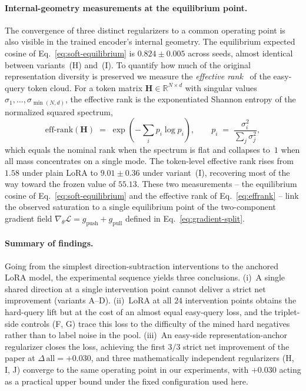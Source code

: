 \paragraph{Internal-geometry measurements at the equilibrium point.}
The convergence of three distinct regularizers to a common operating point is also visible in the trained encoder's internal geometry. The equilibrium expected cosine of Eq.~\eqref{eq:soft-equilibrium} is $0.824 \pm 0.005$ across seeds, almost identical between variants~(H) and~(I). To quantify how much of the original representation diversity is preserved we measure the \emph{effective rank}~\cite{roy2007effective} of the easy-query token cloud. For a token matrix $\mathbf{H} \in \mathbb{R}^{N\times d}$ with singular values $\sigma_1, \ldots, \sigma_{\min(N,d)}$, the effective rank is the exponentiated Shannon entropy of the normalized squared spectrum,
\begin{equation}
\mathrm{eff\text{-}rank}(\mathbf{H}) \;=\; \exp\!\left(-\sum_{i} p_i \log p_i\right), \qquad p_i \;=\; \frac{\sigma_i^{2}}{\sum_{j} \sigma_j^{2}},
\label{eq:effrank}
\end{equation}
which equals the nominal rank when the spectrum is flat and collapses to~$1$ when all mass concentrates on a single mode. The token-level effective rank rises from $1.58$ under plain LoRA to $9.01 \pm 0.36$ under variant~(I), recovering most of the way toward the frozen value of $55.13$. These two measurements -- the equilibrium cosine of Eq.~\eqref{eq:soft-equilibrium} and the effective rank of Eq.~\eqref{eq:effrank} -- link the observed saturation to a single equilibrium point of the two-component gradient field $\nabla_\theta\mathcal{L} = g_{\text{push}} + g_{\text{pull}}$ defined in Eq.~\eqref{eq:gradient-split}.

\paragraph{Summary of findings.}
Going from the simplest direction-subtraction interventions to the anchored LoRA model, the experimental sequence yields three conclusions. (i)~A single shared direction at a single intervention point cannot deliver a strict net improvement (variants A--D). (ii)~LoRA at all $24$ intervention points obtains the hard-query lift but at the cost of an almost equal easy-query loss, and the triplet-side controls (F, G) trace this loss to the difficulty of the mined hard negatives rather than to label noise in the pool. (iii)~An easy-side representation-anchor regularizer closes the loss, achieving the first $3/3$ strict net improvement of the paper at $\Delta\,\mathrm{all} = +0.030$, and three mathematically independent regularizers (H, I, J) converge to the same operating point in our experiments, with $+0.030$ acting as a practical upper bound under the fixed configuration used here.